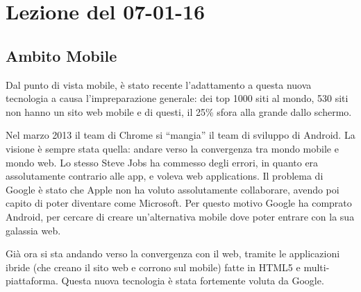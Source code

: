 \section{Lezione del 07-01-16}

\subsection{Ambito Mobile}

Dal punto di vista mobile, \`e stato recente l'adattamento a questa nuova tecnologia a causa l'impreparazione generale: dei top 1000 siti al mondo, 530 siti non hanno un sito web mobile e di questi, il 25\% sfora alla grande dallo schermo.

Nel marzo 2013 il team di Chrome si ``mangia'' il team di sviluppo di Android. La visione \`e sempre stata quella: andare verso la convergenza tra mondo mobile e mondo web. Lo stesso Steve Jobs ha commesso degli errori, in quanto era assolutamente contrario alle app, e voleva web applications. Il problema di Google \`e stato che Apple non ha voluto assolutamente collaborare, avendo poi capito di poter diventare come Microsoft. Per questo motivo Google ha comprato Android, per cercare di creare un'alternativa mobile dove poter entrare con la sua galassia web.

Gi\`a ora si sta andando verso la convergenza con il web, tramite le applicazioni ibride (che creano il sito web e corrono sul mobile) fatte in HTML5 e multi-piattaforma. Questa nuova tecnologia \`e stata fortemente voluta da Google.

